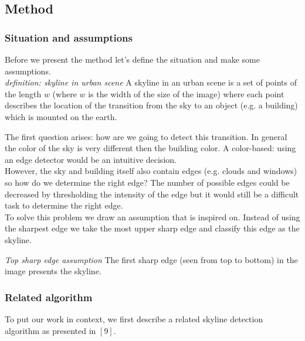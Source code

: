 \subsection{Method} %
\subsubsection{Situation and assumptions}
Before we present the method let's define the situation and make some
assumptions.\\

\textit{definition: skyline in urban scene}
A skyline in an urban scene is a set of points of the length $w$ (where $w$ is the
width of the size of the image) where each point describes the location of the
transition from the sky to an object (e.g. a building) which is mounted on the earth.

The first question arises: how are we going to detect this transition. In
general the color of the sky is very different then the building color. A
color-based: using an edge detector would be an intuitive decision.\\
However, the sky and building itself also contain edges (e.g. clouds and 
windows) so how do we determine the right edge?
The number of possible edges could be decreased by thresholding the intensity of
the edge but it would still be a difficult task to determine the right edge.\\

To solve this problem we draw an assumption that is inspired on.
Instead of using the sharpest edge we take the most upper sharp edge and
classify this edge as the skyline.

\textit{Top sharp edge assumption}
The first sharp edge (seen from top to bottom) in the image 
presents the skyline.




\subsubsection{Related algorithm}
To put our work in context, we first describe
a related skyline detection algorithm as presented in %
$[9]$.\\

